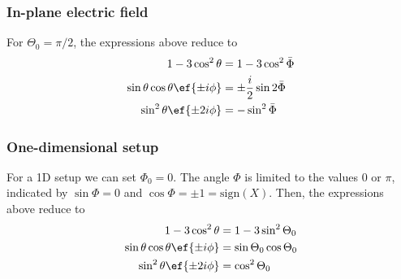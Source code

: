 

\subsubsection{In-plane electric field}
For $\Theta_0=\pi/2$, the expressions above reduce to
\begin{align}
    1-3\cos^2\theta &= 1-3\cos^2\bar\Phi \\
    \sin\theta\cos\theta \ef{\pm i\phi} &= \pm \frac{i}{2} \sin 2\bar\Phi \\
    \sin^2\theta \ef{\pm 2i\phi} &= - \sin^2 \bar\Phi
\end{align}

\subsubsection{One-dimensional setup}
For a 1D setup we can set $\Phi_0=0$. The angle $\Phi$ is limited
to the values $0$ or $\pi$, indicated by $\sin\Phi=0$ and
$\cos\Phi=\pm 1=\text{sign}(X)$. Then, the expressions above reduce to
\begin{align}
    1-3\cos^2\theta &= 1-3\sin^2\Theta_0 \\
    \sin\theta\cos\theta \ef{\pm i\phi} &= \sin\Theta_0 \cos\Theta_0 \\
    \sin^2\theta \ef{\pm 2i\phi} &= \cos^2 \Theta_0
\end{align}

